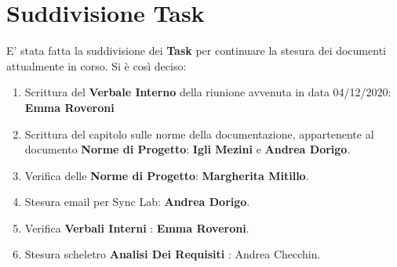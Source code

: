 \documentclass[a4paper,12pt]{report}
\begin{document}
	\chapter{Suddivisione Task}
	E' stata fatta la suddivisione dei \textbf{Task} per continuare la stesura dei documenti attualmente in corso.
	Si è così deciso:
	\begin{enumerate}
		\item Scrittura del \textbf{Verbale Interno} della riunione avvenuta in data 04/12/2020: \textbf{Emma Roveroni}
		\item Scrittura del capitolo sulle norme della documentazione, appartenente al documento \textbf{Norme di Progetto}: \textbf{Igli Mezini} e \textbf{Andrea Dorigo}.
		\item Verifica delle \textbf{Norme di Progetto}: \textbf{Margherita Mitillo}.
		\item Stesura email per Sync Lab: \textbf{Andrea Dorigo}.
		\item Verifica \textbf{Verbali Interni} : \textbf{Emma Roveroni}.
		\item Stesura scheletro \textbf{Analisi Dei Requisiti} : Andrea Checchin.
	\end{enumerate}
\end{document}
